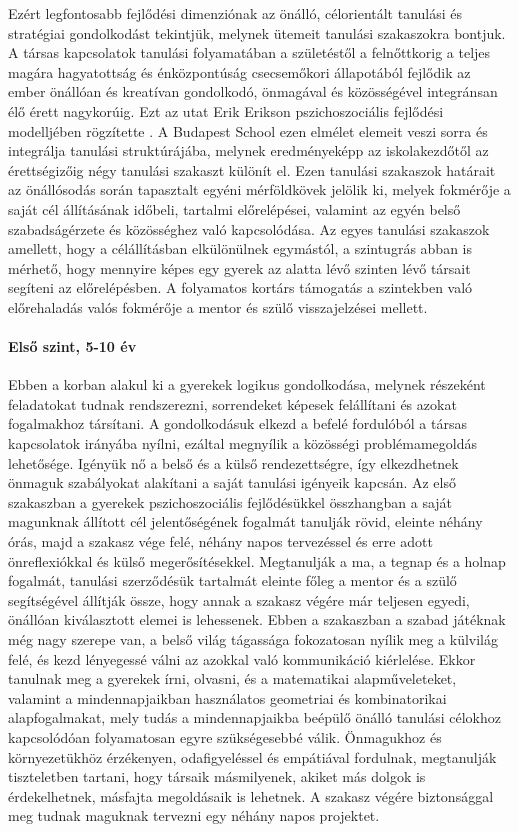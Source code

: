 Ezért legfontosabb fejlődési dimenziónak az önálló, célorientált tanulási és
stratégiai gondolkodást tekintjük, melynek ütemeit tanulási szakaszokra
bontjuk. A társas kapcsolatok tanulási folyamatában a születéstől a
felnőttkorig a teljes magára hagyatottság és énközpontúság csecsemőkori
állapotából fejlődik az ember önállóan és kreatívan gondolkodó, önmagával és
közösségével integránsan élő érett nagykorúig. Ezt az utat Erik Erikson
pszichoszociális fejlődési modelljében rögzítette \citep{Erikson91}. A Budapest
School ezen elmélet elemeit veszi sorra és integrálja tanulási struktúrájába,
melynek eredményeképp az iskolakezdőtől az érettségizőig négy tanulási szakaszt
különít el. Ezen tanulási szakaszok határait az önállósodás során tapasztalt
egyéni mérföldkövek jelölik ki, melyek fokmérője a saját cél állításának
időbeli, tartalmi előrelépései, valamint az egyén belső szabadságérzete és
közösséghez való kapcsolódása.
Az egyes tanulási szakaszok amellett, hogy a célállításban elkülönülnek
egymástól, a szintugrás abban is mérhető, hogy mennyire képes egy gyerek az
alatta lévő szinten lévő társait segíteni az előrelépésben. A folyamatos
kortárs támogatás a szintekben való előrehaladás valós fokmérője a mentor és
szülő visszajelzései mellett.

\paragraph{Első szint, 5-10 év }

Ebben a korban alakul ki a gyerekek logikus gondolkodása, melynek részeként
feladatokat tudnak rendszerezni, sorrendeket képesek felállítani és azokat
fogalmakhoz társítani. A gondolkodásuk elkezd a befelé fordulóból a társas
kapcsolatok irányába nyílni, ezáltal megnyílik a közösségi problémamegoldás
lehetősége. Igényük nő a belső és a külső rendezettségre, így elkezdhetnek
önmaguk szabályokat alakítani a saját tanulási igényeik kapcsán.
Az első szakaszban a gyerekek pszichoszociális fejlődésükkel összhangban a
saját magunknak állított cél jelentőségének fogalmát tanulják rövid, eleinte
néhány órás, majd a szakasz vége felé, néhány napos tervezéssel és erre adott
önreflexiókkal és külső megerősítésekkel. Megtanulják a ma, a tegnap és a
holnap fogalmát, tanulási szerződésük tartalmát eleinte főleg a mentor és a
szülő segítségével állítják össze, hogy annak a szakasz végére már teljesen
egyedi, önállóan kiválasztott elemei is lehessenek.
Ebben a szakaszban a szabad játéknak még nagy szerepe van, a belső világ
tágassága fokozatosan nyílik meg a külvilág felé, és kezd lényegessé válni az
azokkal való kommunikáció kiérlelése.
Ekkor tanulnak meg a gyerekek írni, olvasni, és a matematikai alapműveleteket,
valamint a mindennapjaikban használatos  geometriai és kombinatorikai
alapfogalmakat, mely tudás a mindennapjaikba beépülő önálló tanulási célokhoz
kapcsolódóan folyamatosan egyre szükségesebbé válik. Önmagukhoz és
környezetükhöz érzékenyen, odafigyeléssel és empátiával fordulnak, megtanulják
tiszteletben tartani, hogy társaik másmilyenek, akiket más dolgok is
érdekelhetnek, másfajta megoldásaik is lehetnek.
A szakasz végére biztonsággal meg tudnak maguknak tervezni egy néhány napos
projektet.

